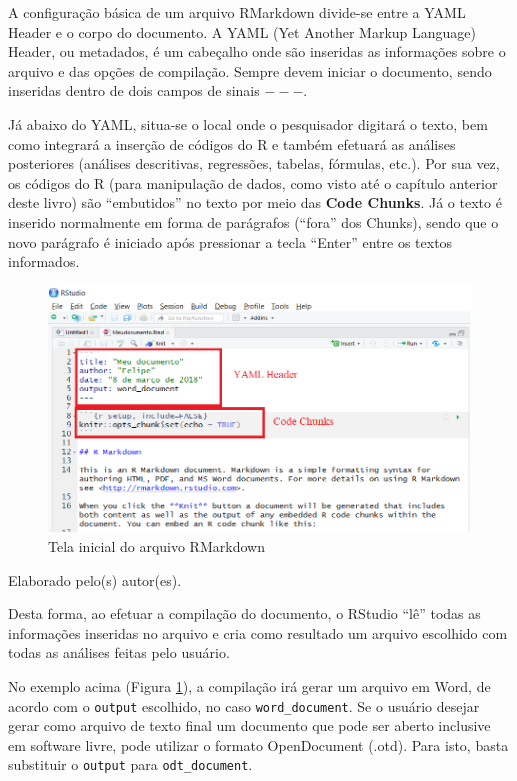 \documentclass[12pt,brazil,oneside]{book}
\begin{document}
A configuração básica de um arquivo RMarkdown divide-se entre a YAML
Header e o corpo do documento. A YAML (Yet Another Markup Language)
Header, ou metadados, é um cabeçalho onde são inseridas as informações
sobre o arquivo e das opções de compilação. Sempre devem iniciar o
documento, sendo inseridas dentro de dois campos de sinais \(---\).

Já abaixo do YAML, situa-se o local onde o pesquisador digitará o texto,
bem como integrará a inserção de códigos do R e também efetuará as
análises posteriores (análises descritivas, regressões, tabelas,
fórmulas, etc.). Por sua vez, os códigos do R (para manipulação de
dados, como visto até o capítulo anterior deste livro) são ``embutidos''
no texto por meio das \textbf{Code Chunks}. Já o texto é inserido
normalmente em forma de parágrafos (``fora'' dos Chunks), sendo que o
novo parágrafo é iniciado após pressionar a tecla ``Enter'' entre os
textos informados.

\begin{figure}[H]

{\centering \includegraphics[width=0.8\linewidth]{rmark2} 

}

\caption{Tela inicial do arquivo RMarkdown}\label{fig:rmark2}
\end{figure}

Elaborado pelo(s) autor(es).

Desta forma, ao efetuar a compilação do documento, o RStudio ``lê''
todas as informações inseridas no arquivo e cria como resultado um
arquivo escolhido com todas as análises feitas pelo usuário.

No exemplo acima (Figura \ref{fig:rmark2}), a compilação irá gerar um
arquivo em Word, de acordo com o \texttt{output} escolhido, no caso
\texttt{word\_document}. Se o usuário desejar gerar como arquivo de
texto final um documento que pode ser aberto inclusive em software
livre, pode utilizar o formato OpenDocument (.otd). Para isto, basta
substituir o \texttt{output} para \texttt{odt\_document}.
\end{document}
